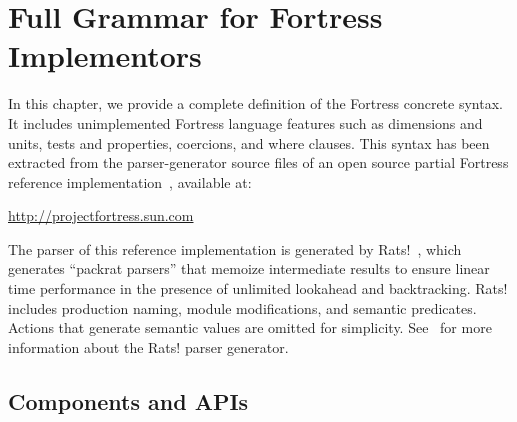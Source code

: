 %
%
%
%

\chapter{Full Grammar for Fortress Implementors}


In this chapter, we provide a complete definition of the Fortress concrete
syntax.  It includes unimplemented Fortress language features
such as dimensions and units, tests and properties, coercions, and where
clauses.  This syntax has been extracted from the parser-generator source
files of an open source partial Fortress reference
implementation~\cite{FortressInterpreter}, available at:

\begin{center}
\url{http://projectfortress.sun.com}
\end{center}

The parser of this reference implementation is generated by Rats!~\cite{Rats},
which generates ``packrat parsers'' that memoize intermediate results to
ensure linear time performance in the presence of unlimited lookahead and
backtracking.  Rats! includes production naming, module modifications, and
semantic predicates.  Actions that generate
semantic values are omitted for simplicity. See~\cite{Rats} for more
information about the Rats! parser generator.

\footnotesize

\section{Components and APIs}


